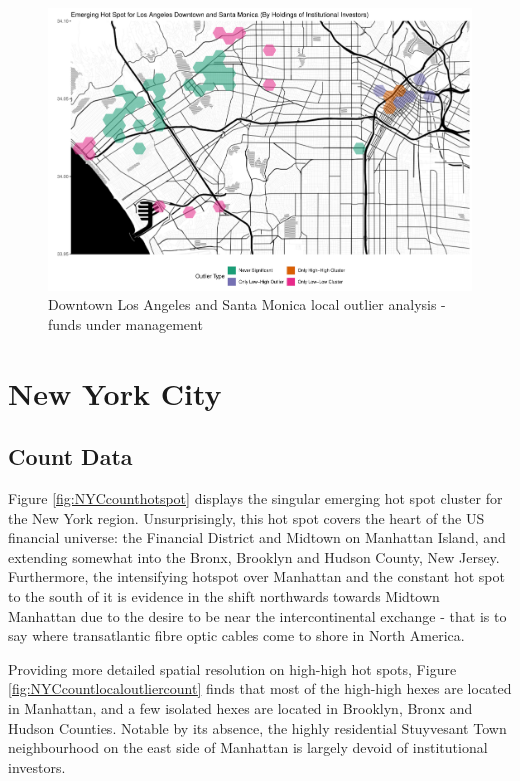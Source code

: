 \begin{figure}
	\centering
	\includegraphics[width=1\linewidth]{Figures/ChapterIV/LA_Money_LO_Downtown}
	\caption[Downtown Los Angeles and Santa Monica Local Outlier Analysis - Funds Under Management 2013-2018]{Downtown Los Angeles and Santa Monica local outlier analysis - funds under management}
	\label{fig:LAlocaloutlier_Downtown}
\end{figure}

\section{New York City}

\subsection{Count Data}

Figure \ref{fig:NYCcounthotspot} displays the singular emerging hot spot cluster for the New York region.  Unsurprisingly, this hot spot covers the heart of the US financial universe: the Financial District and Midtown on Manhattan Island, and extending somewhat into the Bronx, Brooklyn and Hudson County, New Jersey.   Furthermore, the intensifying hotspot over Manhattan and the constant hot spot to the south of it is evidence in the shift northwards towards Midtown Manhattan due to the desire to be near the intercontinental exchange - that is to say where transatlantic fibre optic cables come to shore in North America.     

Providing more detailed spatial resolution on high-high hot spots, Figure \ref{fig:NYCcountlocaloutliercount} finds that most of the high-high hexes are located in Manhattan, and a few isolated hexes are located in Brooklyn, Bronx and Hudson Counties.  Notable by its absence, the highly residential Stuyvesant Town neighbourhood on the east side of Manhattan is largely devoid of institutional investors.      



